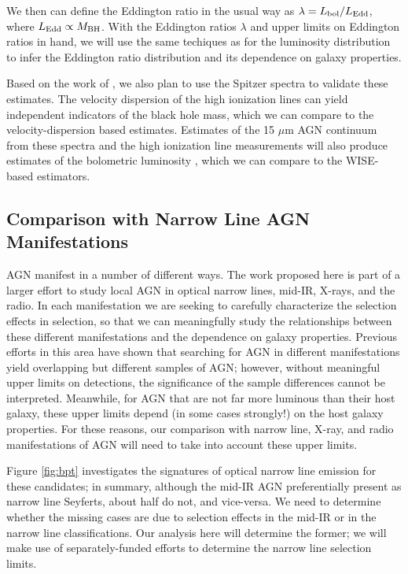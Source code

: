\documentclass[12pt, preprint]{hacked-aastex}
\begin{document}
We then can define the Eddington ratio in the usual way as $\lambda =
L_{\rm bol} / L_{\rm Edd}$, where $L_{\rm Edd}\propto M_{\rm BH}$.
With the Eddington ratios $\lambda$ and upper limits on Eddington
ratios in hand, we will use the same techiques as for the luminosity
distribution to infer the Eddington ratio distribution and its
dependence on galaxy properties.

Based on the work of \cite{dasyra08a}, we also plan to use the Spitzer
spectra to validate these estimates.  The velocity dispersion of the
high ionization lines can yield independent indicators of the black
hole mass, which we can compare to the velocity-dispersion based
estimates. Estimates of the 15 $\mu$m AGN continuum from these spectra
and the high ionization line measurements will also produce estimates
of the bolometric luminosity \cite{dasyra08a, shen20a}, which we can
compare to the WISE-based estimators. 

\subsection{Comparison with Narrow Line AGN Manifestations}
\label{sec:other}

AGN manifest in a number of different ways. The work proposed here is
part of a larger effort to study local AGN in optical narrow lines,
mid-IR, X-rays, and the radio. In each manifestation we are seeking to
carefully characterize the selection effects in selection, so that we
can meaningfully study the relationships between these different
manifestations and the dependence on galaxy properties. Previous
efforts in this area have shown that searching for AGN in different
manifestations yield overlapping but different samples of AGN;
however, without meaningful upper limits on detections, the
significance of the sample differences cannot be
interpreted. Meanwhile, for AGN that are not far more luminous than
their host galaxy, these upper limits depend (in some cases strongly!)
on the host galaxy properties.  For these reasons, our comparison with
narrow line, X-ray, and radio manifestations of AGN will need to take
into account these upper limits.

Figure \ref{fig:bpt} investigates the signatures of optical narrow
line emission for these candidates; in summary, although the mid-IR
AGN preferentially present as narrow line Seyferts, about half do not,
and vice-versa. We need to determine whether the missing cases are due
to selection effects in the mid-IR or in the narrow line
classifications. Our analysis here will determine the former; we will
make use of separately-funded efforts to determine the narrow line
selection limits. 
\end{document}
